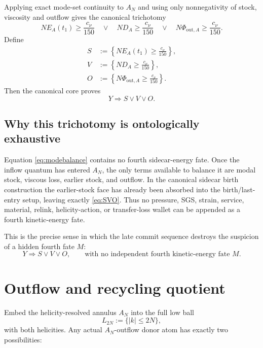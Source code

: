 \documentclass[11pt]{article}
\begin{document}
Applying exact mode-set continuity to $A_N$ and using only nonnegativity of stock, viscosity and outflow gives the canonical trichotomy
\begin{equation}\label{eq:SVO}
\boxed{
N E_A(t_1)\ge\frac{c_\nu}{150}
\quad\vee\quad
N D_A\ge\frac{c_\nu}{150}
\quad\vee\quad
N\Phi_{\mathrm{out},A}\ge\frac{c_\nu}{150}.
}
\end{equation}
Define
\begin{align*}
S&:=\left\{N E_A(t_1)\ge\frac{c_\nu}{150}\right\},\\
V&:=\left\{N D_A\ge\frac{c_\nu}{150}\right\},\\
O&:=\left\{N\Phi_{\mathrm{out},A}\ge\frac{c_\nu}{150}\right\}.
\end{align*}
Then the canonical core proves
\begin{equation}\label{eq:YtoSVO}
\boxed{
Y\Longrightarrow S\vee V\vee O.
}
\end{equation}

\subsection{Why this trichotomy is ontologically exhaustive}

Equation \eqref{eq:modebalance} contains no fourth sidecar-energy fate.  Once the inflow quantum has entered $A_N$, the only terms available to balance it are modal stock, viscous loss, earlier stock, and outflow.  In the canonical sidecar birth construction the earlier-stock face has already been absorbed into the birth/last-entry setup, leaving exactly \eqref{eq:SVO}.  Thus no pressure, SGS, strain, service, material, relink, helicity-action, or transfer-loss wallet can be appended as a fourth kinetic-energy fate.

This is the precise sense in which the late commit sequence destroys the suspicion of a hidden fourth fate $M$:
\begin{equation}\label{eq:noM}
\boxed{
Y\Longrightarrow S\vee V\vee O,
\qquad
\text{with no independent fourth kinetic-energy fate }M.
}
\end{equation}

\section{Outflow and recycling quotient}

Embed the helicity-resolved annulus $A_N$ into the full low ball
\[
L_{2N}:=\{|k|\le2N\},
\]
with both helicities.  Any actual $A_N$-outflow donor atom has exactly two possibilities:
\end{document}
